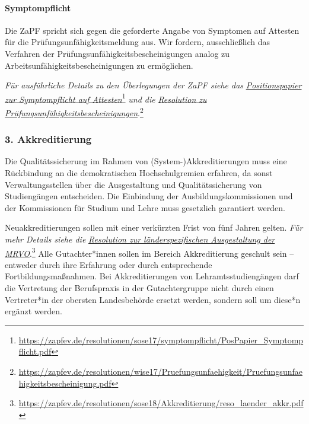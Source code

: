 \documentclass[DIV=calc]{scrartcl}
\begin{document}
\hypertarget{symptompflicht}{%
\paragraph{Symptompflicht}\label{symptompflicht}}

Die ZaPF spricht sich gegen die geforderte Angabe von Symptomen auf Attesten für die Prüfungsunfähigkeitsmeldung aus. Wir fordern, ausschließlich das Verfahren der Prüfungsunfähigkeitsbescheinigungen analog zu Arbeitsunfähigkeitsbescheinigungen zu ermöglichen.

\emph{Für ausführliche Details zu den Überlegungen der ZaPF siehe das} \href{https://zapfev.de/resolutionen/sose17/symptompflicht/PosPapier_Symptompflicht.pdf}{\emph{Positionspapier
zur Symptompflicht auf Attesten}}\footnote{\url{https://zapfev.de/resolutionen/sose17/symptompflicht/PosPapier_Symptompflicht.pdf}} \emph{und die} \href{https://zapfev.de/resolutionen/wise17/Pruefungsunfaehigkeit/Pruefungsunfaehigkeitsbescheinigung.pdf}{\emph{Resolution
zu Prüfungsunfähigkeitsbescheinigungen}}.\footnote{\url{https://zapfev.de/resolutionen/wise17/Pruefungsunfaehigkeit/Pruefungsunfaehigkeitsbescheinigung.pdf}}


\hypertarget{akkreditierung}{%
\subsubsection*{3. Akkreditierung}\label{akkreditierung}}

Die Qualitätssicherung im Rahmen von (System-)Akkreditierungen muss eine Rückbindung an die demokratischen Hochschulgremien erfahren, da sonst Verwaltungsstellen über die Ausgestaltung und Qualitätssicherung von Studiengängen entscheiden. Die Einbindung der Ausbildungskommissionen und der Kommissionen für Studium und Lehre muss gesetzlich garantiert werden.

Neuakkreditierungen sollen mit einer verkürzten Frist von fünf Jahren
gelten. \emph{Für mehr Details siehe die }\href{https://zapfev.de/resolutionen/sose18/Akkreditierung/reso_laender_akkr.pdf}{\emph{Resolution zur länderspezifischen Ausgestaltung der MRVO}}.\footnote{\url{https://zapfev.de/resolutionen/sose18/Akkreditierung/reso_laender_akkr.pdf}} Alle Gutachter*innen sollen im Bereich Akkreditierung geschult sein -- entweder durch ihre Erfahrung oder durch entsprechende Fortbildungsmaßnahmen. Bei Akkreditierungen von Lehramtsstudiengängen darf die Vertretung der Berufspraxis in der Gutachtergruppe nicht durch einen Vertreter*in der obersten Landesbehörde ersetzt werden, sondern soll um diese*n ergänzt werden.
\end{document}

